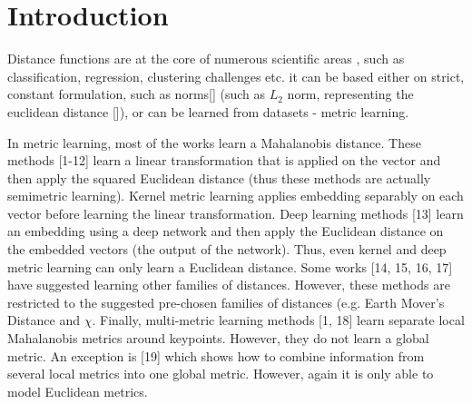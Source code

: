 
\chapter{Introduction} %

\label{Chapter1} %


\newcommand{\keyword}[1]{\textbf{#1}}
\newcommand{\tabhead}[1]{\textbf{#1}}
\newcommand{\code}[1]{\texttt{#1}}
\newcommand{\file}[1]{\texttt{\bfseries#1}}
\newcommand{\option}[1]{\texttt{\itshape#1}}


Distance functions are at the core of numerous scientific areas , such as classification, regression, clustering challenges etc.
it can be based either on strict, constant formulation, such as norms[] (such as $L_2$ norm, representing the euclidean distance []), or can be learned from datasets - metric learning.

In metric learning, most of the works learn a Mahalanobis distance. These methods [1-12] learn a linear transformation that is applied on the vector and then apply the squared Euclidean distance (thus these methods are actually semimetric learning). 
Kernel metric learning applies embedding separably on each vector before learning the linear transformation. 
Deep learning methods [13] learn an embedding using a deep network and then apply the Euclidean distance on the embedded vectors (the output of the network). Thus, even kernel and deep metric learning can only learn a Euclidean distance. 
Some works [14, 15, 16, 17] have suggested learning other families of distances. However, these methods are restricted to the suggested pre-chosen families of distances (e.g. Earth Mover’s Distance and $\chi$.
Finally, multi-metric learning methods [1, 18] learn separate local Mahalanobis metrics around
keypoints. However, they do not learn a global metric. An exception is [19] which shows how
to combine information from several local metrics into one global metric. However, again it is only able to model Euclidean metrics.

